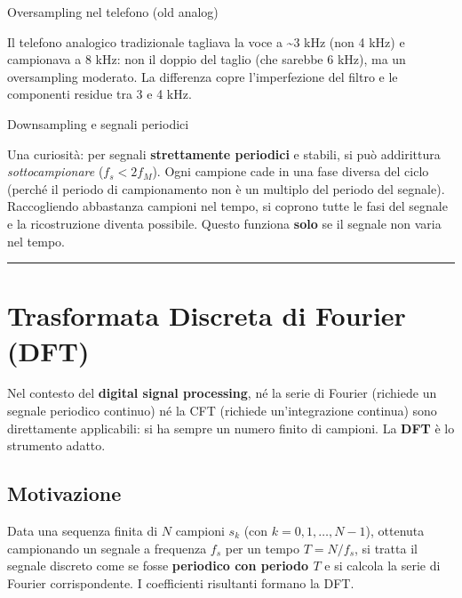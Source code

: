 \documentclass[
  italian,
  openany]{book}
\begin{document}
\begin{callouttip}{Oversampling nel telefono (old analog)}

Il telefono analogico tradizionale tagliava la voce a \textasciitilde3
kHz (non 4 kHz) e campionava a 8 kHz: non il doppio del taglio (che
sarebbe 6 kHz), ma un oversampling moderato. La differenza copre
l'imperfezione del filtro e le componenti residue tra 3 e 4 kHz.

\end{callouttip}

\begin{calloutnote}{Downsampling e segnali periodici}

Una curiosità: per segnali \textbf{strettamente periodici} e stabili, si
può addirittura \emph{sottocampionare} (\(f_s < 2f_M\)). Ogni campione
cade in una fase diversa del ciclo (perché il periodo di campionamento
non è un multiplo del periodo del segnale). Raccogliendo abbastanza
campioni nel tempo, si coprono tutte le fasi del segnale e la
ricostruzione diventa possibile. Questo funziona \textbf{solo} se il
segnale non varia nel tempo.

\end{calloutnote}

\begin{center}\rule{0.5\linewidth}{0.5pt}\end{center}

\section{Trasformata Discreta di Fourier
(DFT)}\label{trasformata-discreta-di-fourier-dft}

Nel contesto del \textbf{digital signal processing}, né la serie di
Fourier (richiede un segnale periodico continuo) né la CFT (richiede
un'integrazione continua) sono direttamente applicabili: si ha sempre un
numero finito di campioni. La \textbf{DFT} è lo strumento adatto.

\subsection{Motivazione}\label{motivazione}

Data una sequenza finita di \(N\) campioni \(s_k\) (con
\(k = 0, 1, \ldots, N-1\)), ottenuta campionando un segnale a frequenza
\(f_s\) per un tempo \(T = N/f_s\), si tratta il segnale discreto come
se fosse \textbf{periodico con periodo \(T\)} e si calcola la serie di
Fourier corrispondente. I coefficienti risultanti formano la DFT.
\end{document}
